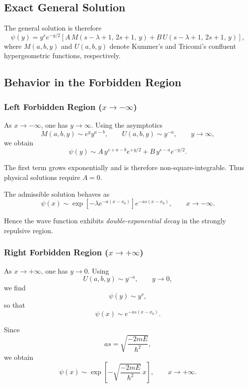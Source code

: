 \subsection{Exact General Solution}

The general solution is therefore
\begin{equation}
\psi(y)
=
y^{s} e^{-y/2}
\left[
A\, M(s-\lambda+1,\,2s+1,\,y)
+
B\, U(s-\lambda+1,\,2s+1,\,y)
\right],
\label{general}
\end{equation}
where $M(a,b,y)$ and $U(a,b,y)$ denote Kummer's and Tricomi's confluent
hypergeometric functions, respectively.

\subsection{Behavior in the Forbidden Region}

\subsubsection*{Left Forbidden Region ($x\to -\infty$)}

As $x\to -\infty$, one has $y\to\infty$.  
Using the asymptotics
\[
M(a,b,y)\sim e^{y}y^{a-b},
\qquad
U(a,b,y)\sim y^{-a},
\qquad y\to\infty,
\]
we obtain
\[
\psi(y)\sim
A\, y^{s+a-b} e^{+y/2}
+
B\, y^{s-a} e^{-y/2}.
\]

The first term grows exponentially and is therefore non-square-integrable.
Thus physical solutions require $A=0$.

The admissible solution behaves as
\begin{equation}
\psi(x)
\sim
\exp\!\left[-\lambda e^{-a(x-x_0)}\right]
e^{-as(x-x_0)},
\qquad x\to -\infty.
\label{leftasymp}
\end{equation}

Hence the wave function exhibits \emph{double-exponential decay}
in the strongly repulsive region.

\subsubsection*{Right Forbidden Region ($x\to +\infty$)}

As $x\to +\infty$, one has $y\to 0$.  
Using
\[
U(a,b,y)\sim y^{-a},
\qquad y\to 0,
\]
we find
\[
\psi(y)\sim y^{s},
\]
so that
\begin{equation}
\psi(x)
\sim
e^{-as(x-x_0)}.
\end{equation}

Since
\[
as = \sqrt{\frac{-2mE}{\hbar^2}},
\]
we obtain
\begin{equation}
\psi(x)
\sim
\exp\!\left[
-\sqrt{\frac{-2mE}{\hbar^2}}\,x
\right],
\qquad x\to +\infty.
\label{rightasymp}
\end{equation}

